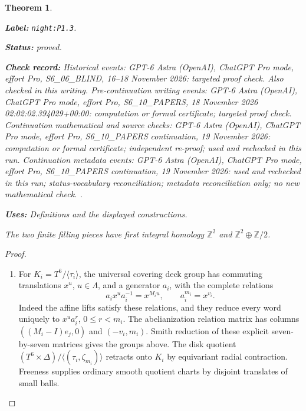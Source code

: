 \documentclass[11pt,a4paper]{article}
\newtheorem{theorem}{Theorem}[section]
\theoremstyle{definition}
\newcommand{\StatementRecord}[4]{\par\smallskip\begingroup\upshape\raggedright\noindent\textbf{Label:} \nolinkurl{#1}.\par\noindent\textbf{Status:} #2.\par\noindent\textbf{Check record:} #3.\par\noindent\textbf{Uses:} #4.\par\endgroup\smallskip}
\begin{document}
\begin{theorem}\label{night:P1.3}
\StatementRecord{night:P1.3}{proved}{Historical events: GPT-6 Astra (OpenAI), ChatGPT Pro mode, effort Pro, S6\_06\_BLIND, 16--18 November 2026: targeted proof check. Also checked in this writing. Pre-continuation writing events: GPT-6 Astra (OpenAI), ChatGPT Pro mode, effort Pro, S6\_10\_PAPERS, 18 November 2026 02:02:02.394029+00:00: computation or formal certificate; targeted proof check. Continuation mathematical and source checks: GPT-6 Astra (OpenAI), ChatGPT Pro mode, effort Pro, S6\_10\_PAPERS continuation, 19 November 2026: computation or formal certificate; independent re-proof; used and rechecked in this run. Continuation metadata events: GPT-6 Astra (OpenAI), ChatGPT Pro mode, effort Pro, S6\_10\_PAPERS continuation, 19 November 2026: used and rechecked in this run; status-vocabulary reconciliation; metadata reconciliation only; no new mathematical check. }{Definitions and the displayed constructions}
The two finite filling pieces have first integral homology
$\mathbb Z^2$ and $\mathbb Z^2\oplus\mathbb Z/2$.
\end{theorem}
\begin{proof}
\begin{enumerate}[label=\arabic*.]
\item For $K_i=T^6/\langle\tau_i\rangle$, the universal covering deck group
has commuting translations $x^u$, $u\in\Lambda$, and a generator $a_i$,
with the complete relations
\[
a_ix^ua_i^{-1}=x^{M_iu},\qquad a_i^{m_i}=x^{v_i}.
\]
Indeed the affine lifts satisfy these relations, and they reduce every
word uniquely to $x^ua_i^r$, $0\leq r<m_i$.
The abelianization relation matrix has columns
$((M_i-I)e_j,0)$ and $(-v_i,m_i)$.
Smith reduction of these explicit seven-by-seven matrices gives the
groups above.  The disk quotient
$(T^6\times\Delta)/\langle(\tau_i,\zeta_{m_i})\rangle$
retracts onto $K_i$ by equivariant radial contraction.  Freeness supplies
ordinary smooth quotient charts by disjoint translates of small balls.

\end{enumerate}
\end{proof}
\end{document}
